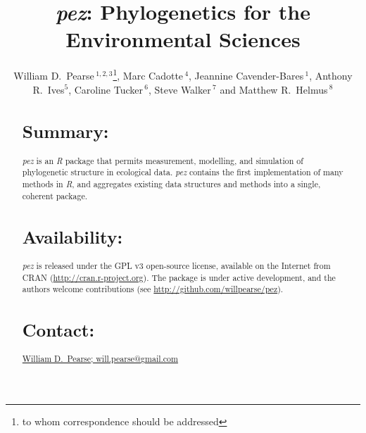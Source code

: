 \documentclass{bioinfo}
\begin{document}

\title[\emph{pez}]{\emph{pez}: Phylogenetics for the Environmental
  Sciences} \author[Pearse \textit{et~al}]{William D.\
  Pearse\,$^{1,2,3}$\footnote{to whom correspondence should be
    addressed}, Marc Cadotte\,$^{4}$, Jeannine Cavender-Bares\,$^1$,
  Anthony R.\ Ives$^5$, Caroline Tucker\,$^6$, Steve Walker\,$^7$ and
  Matthew R.\ Helmus\,$^8$} \address{$^1$Department of Ecology,
  Evolution, and Behavior, University of Minnesota, 100 Ecology
  Building, 1987 Upper Buford Circle, Saint Paul, Minnesota, USA,
  $^2$Department of Biology, McGill University, 1205 Avenue Docteur
  Penfield, Montr\'{e}al, Qu\'{e}bec, Canada, $^3$D\'{e}partement des
  Sciences Biologiques, Universit\'{e} du Qu\'{e}bec \`{a}
  Montr\'{e}al, Succursale Centre-ville, Montr\'{e}al, Qu\'{e}bec,
  Canada, $^4$Department of Biological Sciences, University of
  Toronto–Scarborough, 1265 Military Trail, Scarborough, Ontario,
  Canada, $^5$Department of Zoology, University of Wisconsin, Madison,
  Wisconsin, USA $^6$Department of Ecology and Evolutionary Biology,
  University of Colorado, Boulder, CO, USA, $^7$Department of
  Mathematics and Statistics, McMaster University, Hamilton, Ontario,
  Canada, $^8$Department of Animal Ecology, Vrije Universiteit, 1081
  HV, Amsterdam, The Netherlands} \history{} \editor{}
\maketitle
\begin{abstract}
\section{Summary:}
\emph{pez} is an \emph{R} package that permits measurement, modelling,
and simulation of phylogenetic structure in ecological
data. \emph{pez} contains the first implementation of many methods in
\emph{R}, and aggregates existing data structures and methods into a
single, coherent package.
\section{Availability:}
\emph{pez} is released under the GPL v3 open-source license, available
on the Internet from CRAN
(\href{http://cran.r-project.org}{http://cran.r-project.org}). The
package is under active development, and the authors welcome
contributions (see
\href{http://github.com/willpearse/pez}{http://github.com/willpearse/pez}).
\section{Contact:} \href{will.pearse@gmail.com}{William D.\ Pearse; will.pearse@gmail.com}
\end{abstract}
\end{document}
